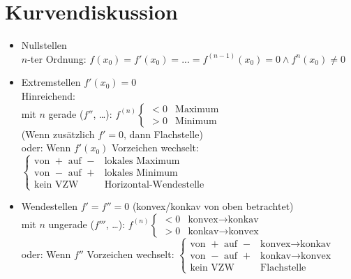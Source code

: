\documentclass{scrreprt}
\begin{document}
\section{Kurvendiskussion}
\begin{itemize}
\item Nullstellen\\
$n$-ter Ordnung: $f(x_0) = f'(x_0)=...=f^{(n-1)}(x_0)=0 \wedge f^n (x_0) \not = 0$
\item Extremstellen $f'(x_0)=0$\\
Hinreichend: \\
mit $n$ gerade ($f''$, …): $f^{(n)}\begin{cases}
<0 & \text{Maximum}\\
>0 & \text{Minimum}
\end{cases}$\\
(Wenn zusätzlich $f'=0$, dann Flachstelle)\\
oder: Wenn $f'(x_0)$ Vorzeichen wechselt: $\begin{cases}
\text{von }+ \text{ auf }-&\text{lokales Maximum}\\
\text{von }- \text{ auf }+&\text{lokales Minimum}\\
\text{kein VZW} & \text{Horizontal-Wendestelle}
\end{cases}$
\item Wendestellen $f'=f''=0$ (konvex/konkav von oben betrachtet)\\
mit $n$ ungerade ($f'''$, …): $f^{(n)}\begin{cases}
<0 & \text{konvex}\to \text{konkav}\\
>0 & \text{konkav}\to \text{konvex}
\end{cases}$\\
oder: Wenn $f''$ Vorzeichen wechselt: $\begin{cases}
\text{von }+ \text{ auf }-&\text{konvex}\to \text{konkav}\\
\text{von }- \text{ auf }+&\text{konkav}\to \text{konvex}\\
\text{kein VZW} & \text{Flachstelle}
\end{cases}$
\end{itemize}
\end{document}
